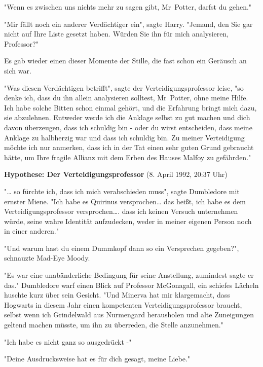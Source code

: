 {"Wenn es zwischen uns nichts mehr zu sagen gibt, Mr~Potter, darfst du gehen."

"Mir fällt noch ein anderer Verdächtiger ein", sagte Harry. "Jemand, den Sie gar nicht auf Ihre Liste gesetzt haben. Würden Sie ihn für mich analysieren, Professor?"

Es gab wieder einen dieser Momente der Stille, die fast schon ein Geräusch an sich war.

"Was diesen Verdächtigen betrifft", sagte der Verteidigungsprofessor leise, "so denke ich, dass du ihn allein analysieren solltest, Mr~Potter, ohne meine Hilfe. Ich habe solche Bitten schon einmal gehört, und die Erfahrung bringt mich dazu, sie abzulehnen. Entweder werde ich die Anklage selbst zu gut machen und dich davon überzeugen, dass ich schuldig bin - oder du wirst entscheiden, dass meine Anklage zu halbherzig war und dass ich schuldig bin. Zu meiner Verteidigung möchte ich nur anmerken, dass ich in der Tat einen sehr guten Grund gebraucht hätte, um Ihre fragile Allianz mit dem Erben des Hauses Malfoy zu gefährden."

\textbf{Hypothese: Der Verteidigungsprofessor} (8. April 1992, 20:37 Uhr)

"… so fürchte ich, dass ich mich verabschieden muss", sagte Dumbledore mit ernster Miene. "Ich habe es Quirinus versprochen… das heißt, ich habe es dem Verteidigungsprofessor versprochen…. dass ich keinen Versuch unternehmen würde, seine wahre Identität aufzudecken, weder in meiner eigenen Person noch in einer anderen."

"Und warum hast du einem Dummkopf dann so ein Versprechen gegeben?", schnauzte Mad-Eye Moody.

"Es war eine unabänderliche Bedingung für seine Anstellung, zumindest sagte er das." Dumbledore warf einen Blick auf Professor McGonagall, ein schiefes Lächeln huschte kurz über sein Gesicht. "Und Minerva hat mir klargemacht, dass Hogwarts in diesem Jahr einen kompetenten Verteidigungsprofessor braucht, selbst wenn ich Grindelwald aus Nurmengard herausholen und alte Zuneigungen geltend machen müsste, um ihn zu überreden, die Stelle anzunehmen."

"Ich habe es nicht ganz so ausgedrückt -"

"Deine Ausdrucksweise hat es für dich gesagt, meine Liebe."

}
